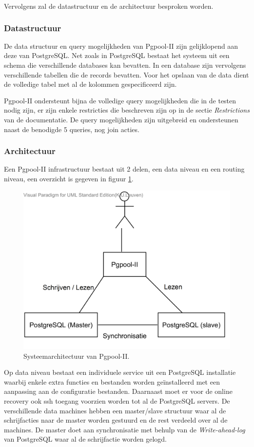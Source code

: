 Vervolgens zal de datastructuur en de architectuur besproken worden.  
\subsubsection{Datastructuur}
De data structuur en query mogelijkheden van Pgpool-II zijn gelijklopend aan deze van PostgreSQL. Net zoals in PostgreSQL bestaat het systeem uit een schema die verschillende databases kan bevatten. In een database zijn vervolgens verschillende tabellen die de records bevatten. Voor het opslaan van de data dient de volledige tabel met al de kolommen gespecificeerd zijn. 

Pgpool-II ondersteunt bijna de volledige query mogelijkheden die in de testen nodig zijn, er zijn enkele restricties die beschreven zijn op in de sectie \textit{Restrictions} van de documentatie\cite{pgpool-doc}. De query mogelijkheden zijn uitgebreid en ondersteunen naast de benodigde 5 queries, nog join acties. 

\subsubsection{Architectuur}
Een Pgpool-II infrastructuur bestaat uit 2 delen, een data niveau en een routing niveau, een overzicht is gegeven in figuur \ref{fig:Pgpool-structure}. 

\begin{figure}[h!]
\centering
\includegraphics[width=0.5\linewidth]{img/Pgpool-structuur}
\caption{Systeemarchitectuur van Pgpool-II.}
\label{fig:Pgpool-structure}
\end{figure}

Op data niveau bestaat een individuele service uit een PostgreSQL installatie waarbij enkele extra functies en bestanden worden geïnstalleerd met een aanpassing aan de configuratie bestanden.  Daarnaast moet er voor de online recovery ook ssh toegang voorzien worden tot al de PostgreSQL servers. De verschillende data machines hebben een master/slave structuur waar al de schrijfacties naar de master worden gestuurd en de rest verdeeld over al de machines. De master doet aan synchronisatie met behulp van de \textit{Write-ahead-log} van PostgreSQL waar al de schrijfactie worden gelogd. 

